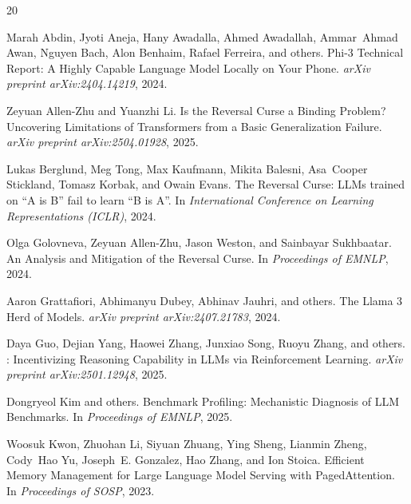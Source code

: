 \documentclass{article}
\begin{document}
\begin{thebibliography}{20}

Marah Abdin, Jyoti Aneja, Hany Awadalla, Ahmed Awadallah, Ammar~Ahmad Awan, Nguyen Bach, Alon Benhaim, Rafael Ferreira, and others.
\newblock Phi-3 Technical Report: A Highly Capable Language Model Locally on Your Phone.
\newblock \emph{arXiv preprint arXiv:2404.14219}, 2024.

Zeyuan Allen-Zhu and Yuanzhi Li.
\newblock Is the Reversal Curse a Binding Problem? Uncovering Limitations of Transformers from a Basic Generalization Failure.
\newblock \emph{arXiv preprint arXiv:2504.01928}, 2025.

Lukas Berglund, Meg Tong, Max Kaufmann, Mikita Balesni, Asa~Cooper Stickland, Tomasz Korbak, and Owain Evans.
\newblock The Reversal Curse: {LLMs} trained on ``{A} is {B}'' fail to learn ``{B} is {A}''.
\newblock In \emph{International Conference on Learning Representations (ICLR)}, 2024.

Olga Golovneva, Zeyuan Allen-Zhu, Jason Weston, and Sainbayar Sukhbaatar.
\newblock An Analysis and Mitigation of the Reversal Curse.
\newblock In \emph{Proceedings of EMNLP}, 2024.

Aaron Grattafiori, Abhimanyu Dubey, Abhinav Jauhri, and others.
\newblock The {Llama} 3 Herd of Models.
\newblock \emph{arXiv preprint arXiv:2407.21783}, 2024.

Daya Guo, Dejian Yang, Haowei Zhang, Junxiao Song, Ruoyu Zhang, and others.
: Incentivizing Reasoning Capability in {LLMs} via Reinforcement Learning.
\newblock \emph{arXiv preprint arXiv:2501.12948}, 2025.

Dongryeol Kim and others.
\newblock Benchmark Profiling: Mechanistic Diagnosis of {LLM} Benchmarks.
\newblock In \emph{Proceedings of EMNLP}, 2025.

Woosuk Kwon, Zhuohan Li, Siyuan Zhuang, Ying Sheng, Lianmin Zheng, Cody~Hao Yu, Joseph~E. Gonzalez, Hao Zhang, and Ion Stoica.
\newblock Efficient Memory Management for Large Language Model Serving with {PagedAttention}.
\newblock In \emph{Proceedings of SOSP}, 2023.


\end{thebibliography}
\end{document}
